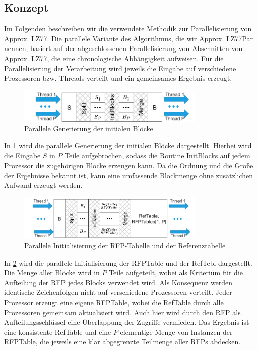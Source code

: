 \subsection{Konzept}
Im Folgenden beschreiben wir die verwendete Methodik zur Parallelisierung von Approx. LZ77. Die parallele Variante des Algorithmus, die wir Approx. LZ77Par nennen, basiert auf der abgeschlossenen
Parallelisierung von Abschnitten von Approx. LZ77, die eine chronologische Abhängigkeit aufweisen. Für die Parallelisierung der Verarbeitung wird jeweils die Eingabe auf verschiedene Prozessoren 
bzw. Threads verteilt und ein gemeinsames Ergebnis erzeugt.
\begin{figure}[ht]
    \centering
    \includegraphics[width=0.8\textwidth]{Images/parallel_initnodes.png}
    \caption{Parallele Generierung der initialen Blöcke}
    \label{fig:parinitnodes}
\end{figure}
In \ref{fig:parinitnodes} wird die parallele Generierung der initialen Blöcke dargestellt. Hierbei wird die Eingabe $S$ in $P$ Teile aufgebrochen, sodass die Routine InitBlocks auf jedem Prozessor
die zugehörigen Blöcke erzeugen kann. Da die Ordnung und die Größe der Ergebnisse bekannt ist, kann eine umfassende Blockmenge ohne zusätzlichen Aufwand erzeugt werden.
\begin{figure}[ht]
    \centering
    \includegraphics[width=0.8\textwidth]{Images/parallel_inittables.png}
    \caption{Parallele Initialisierung der RFP-Tabelle und der Referenztabelle}
    \label{fig:parinittables}
\end{figure}
In \ref{fig:parinittables} wird die parallele Initialisierung der RFPTable und der RefTebl dargestellt. Die Menge aller Blöcke wird in $P$ Teile aufgeteilt, wobei als Kriterium für die
Aufteilung der RFP jedes Blocks verwendet wird. Als Konsequenz werden identische Zeichenfolgen nicht auf verschiedene Prozessoren verteilt. Jeder Prozessor erzeugt eine eigene RFPTable, wobei
die RefTable durch alle Prozessoren gemeinsam aktualisiert wird. Auch hier wird durch den RFP als Aufteilungsschlüssel eine Überlappung der Zugriffe vermieden. Das Ergebnis ist eine konsistente
RefTable und eine $P$-elementige Menge von Instanzen der RFPTable, die jeweils eine klar abgegrenzte Teilmenge aller RFPs abdecken.

